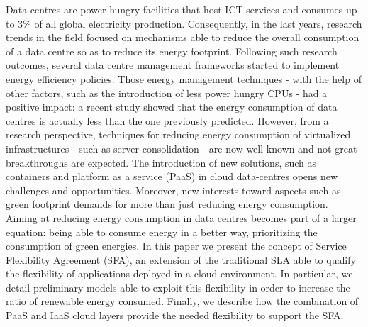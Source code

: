 

Data centres are power-hungry facilities that host ICT services and consumes up to 3\% of all global electricity production.
Consequently, in the last years, research trends in the field focused on mechanisms able to reduce the overall consumption of a data centre so as to reduce its energy footprint.
Following such research outcomes, several data centre management frameworks started to implement energy efficiency policies.
Those energy management techniques - with the help of other factors, such as the introduction of less power hungry CPUs - had a positive impact: a recent study showed that the energy consumption of data centres is actually less than the one previously predicted.
However, from a research perspective, techniques for reducing energy consumption of virtualized infrastructures - such as server consolidation - are now well-known and not great breakthroughs are expected.
The introduction of new solutions, such as containers and platform as a service (PaaS) in cloud data-centres opens new challenges and opportunities.
Moreover, new interests toward aspects such as green footprint demands for more than just reducing energy consumption. 
Aiming at reducing energy consumption in data centres becomes part of a larger equation: being able to consume energy in a better way, prioritizing the consumption of green energies.
In this paper we present the concept of Service Flexibility Agreement (SFA), an extension of the traditional SLA able to qualify the flexibility of applications deployed in a cloud environment.
In particular, we detail preliminary models able to exploit this flexibility in order to increase the ratio of renewable energy consumed.
Finally, we describe how the combination of PaaS and IaaS cloud layers provide the needed flexibility to support the SFA.
